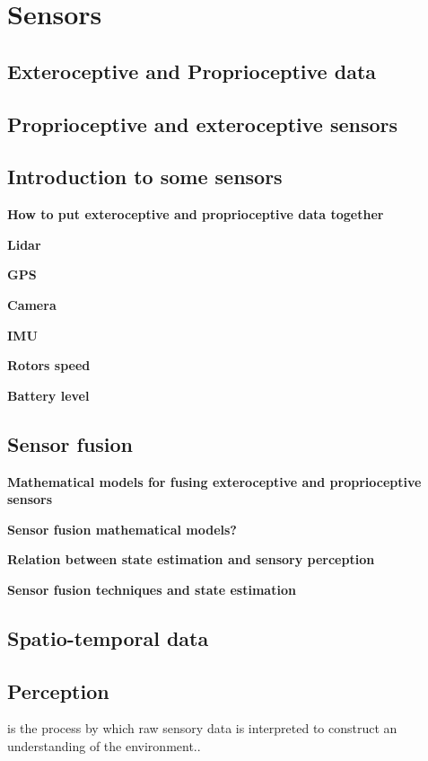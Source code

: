 \chapter{Sensors}





\section{Exteroceptive and Proprioceptive data}

\section{Proprioceptive and exteroceptive sensors}
\section{Introduction to some sensors}
    \textbf{How to put exteroceptive and proprioceptive data together}

    \textbf{Lidar} 

    \textbf{GPS}

    \textbf{Camera} 

    \textbf{IMU}

    \textbf{Rotors speed}

    \textbf{Battery level}

\section{Sensor fusion}
    \textbf {Mathematical models for fusing exteroceptive and proprioceptive sensors}

    \textbf{Sensor fusion mathematical models?}

    \textbf{Relation between state estimation and sensory perception}

    \textbf{Sensor fusion techniques and state estimation}

\section{Spatio-temporal data}

\section{Perception}  is the process by which raw sensory data is interpreted to construct an understanding of the environment..

